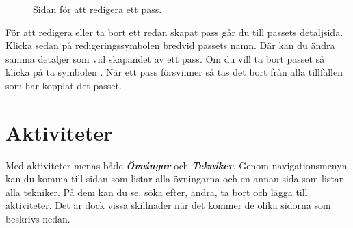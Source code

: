 \documentclass{article}
\newcommand{\term}[1]{\textcolor{secondary}{\textit{\textbf{#1}}}}
\newcommand*{\img}[1]{%
    \raisebox{-.3\baselineskip}{%
        \texttt{[image: \#1]}%
    }%
}
\begin{document}
{\begin{figure}
            \caption{Sidan för att redigera ett pass.}
            \label{fig:workoutEdit}
        \end{figure}
        För att redigera eller ta bort ett redan skapat pass går du till passets detaljsida. Klicka sedan på redigeringssymbolen \img{images/icons ref/pencil.png} bredvid passets namn. Där kan du ändra samma detaljer som vid skapandet av ett pass. Om du vill ta bort passet så klicka på ta symbolen \img{images/icons ref/trash.png}. När ett pass försvinner så tas det bort från alla tillfällen som har kopplat det passet.

\newpage
\section{Aktiviteter}
    Med aktiviteter menas både \term{Övningar} och \term{Tekniker}. Genom navigationsmenyn kan du komma till sidan som listar alla övningarna och en annan sida som listar alla tekniker. På dem kan du se, söka efter, ändra, ta bort och lägga till aktiviteter. Det är dock vissa skillnader när det kommer de olika sidorna som beskrivs nedan.

}
\end{document}
